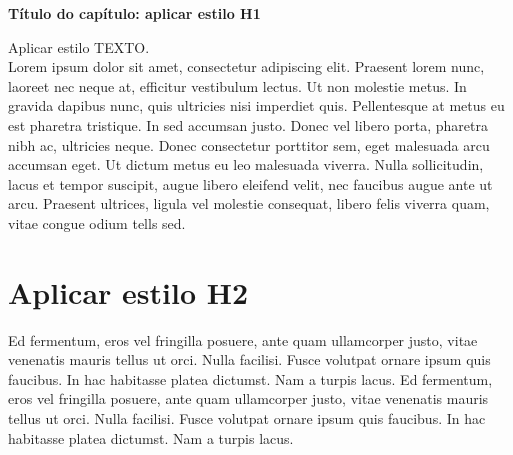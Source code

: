 \documentclass[10.5pt,17.35pt,a4paper]{article}
\begin{document}
\coveramz

\newpage

\secondpageamz

\newpage

{
\thispagestyle{empty}
\hypersetup{linkcolor = cinza_amz2030}
\tableofcontents
}

\newpage

{
\thispagestyle{empty}
\hypersetup{linkcolor = cinza_amz2030}
\listoffigures
}

{
\thispagestyle{empty}
\hypersetup{linkcolor = cinza_amz2030}
\listoftables
}



\newpage




\setcounter{page}{1}
{\fontsize{23}{23}\selectfont  \textcolor{verde_amz2030}{ \textbf{Título do capítulo: aplicar estilo H1} }}

\vspace*{2cm}

Aplicar estilo TEXTO. \\

Lorem ipsum dolor sit amet, consectetur adipiscing elit. Praesent lorem nunc, laoreet nec neque at, efficitur vestibulum lectus. Ut non molestie metus. In gravida dapibus nunc, quis ultricies nisi imperdiet quis. Pellentesque at metus eu est pharetra tristique. In sed accumsan justo. Donec vel libero porta, pharetra nibh ac, ultricies neque. Donec consectetur porttitor sem, eget malesuada arcu accumsan eget. Ut dictum metus eu leo malesuada viverra. Nulla sollicitudin, lacus et tempor suscipit, augue libero eleifend velit, nec faucibus augue ante ut arcu. Praesent ultrices, ligula vel molestie consequat, libero felis viverra quam, vitae congue odium tells sed.


\section{Aplicar estilo H2}

Ed fermentum, eros vel fringilla posuere, ante quam ullamcorper justo, vitae venenatis mauris tellus ut orci. Nulla facilisi. Fusce volutpat ornare ipsum quis faucibus. In hac habitasse platea dictumst. Nam a turpis lacus. Ed fermentum, eros vel fringilla posuere, ante quam ullamcorper justo, vitae venenatis mauris tellus ut orci. Nulla facilisi. Fusce volutpat ornare ipsum quis faucibus. In hac habitasse platea dictumst. Nam a turpis lacus. 
\end{document}
